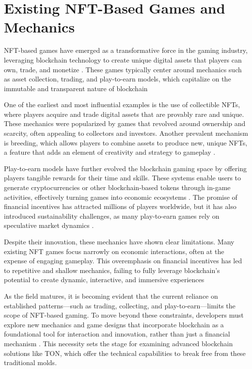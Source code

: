 \section{Existing NFT-Based Games and Mechanics}

NFT-based games have emerged as a transformative force in the gaming industry,
leveraging blockchain technology to create unique digital assets that players
can own, trade, and monetize \cite{shetty_serverfi_2024}. These games typically center
around mechanics such as asset collection, trading, and play-to-earn models,
which capitalize on the immutable and transparent nature of blockchain
\cite{pfeiffer_blockchain_2020, stamatakis_blockchain-powered_2024}

One of the earliest and most influential examples is the use of collectible
NFTs, where players acquire and trade digital assets that are provably rare and
unique. These mechanics were popularized by games that revolved around
ownership and scarcity, often appealing to collectors and
investors\cite{shetty_serverfi_2024}. Another prevalent mechanism is breeding,
which allows players to combine assets to produce new, unique NFTs, a feature
that adds an element of creativity and strategy to gameplay
\cite{pfeiffer_blockchain_2020, jiang_cryptokitties_2021}.

Play-to-earn models have further evolved the blockchain gaming space by offering
players tangible rewards for their time and skills. These systems enable users
to generate cryptocurrencies or other blockchain-based tokens through in-game
activities, effectively turning games into economic ecosystems \cite{shetty_serverfi_2024}.
The promise of financial incentives has attracted millions of players worldwide,
but it has also introduced sustainability challenges, as many play-to-earn games
rely on speculative market dynamics \cite{stamatakis_blockchain-powered_2024}.

Despite their innovation, these mechanics have shown clear limitations. Many
existing NFT games focus narrowly on economic interactions, often at the expense
of engaging gameplay. This overemphasis on financial incentives has led to
repetitive and shallow mechanics, failing to fully leverage blockchain's
potential to create dynamic, interactive, and immersive experiences \cite{stamatakis_blockchain-powered_2024}

As the field matures, it is becoming evident that the current reliance on
established patterns—such as trading, collecting, and play-to-earn—limits the
scope of NFT-based gaming. To move beyond these constraints, developers must
explore new mechanics and game designs that incorporate blockchain as a
foundational tool for interaction and innovation, rather than just a financial
mechanism \cite{shetty_serverfi_2024}. This necessity sets the stage for examining advanced
blockchain solutions like TON, which offer the technical capabilities to break
free from these traditional molds.

